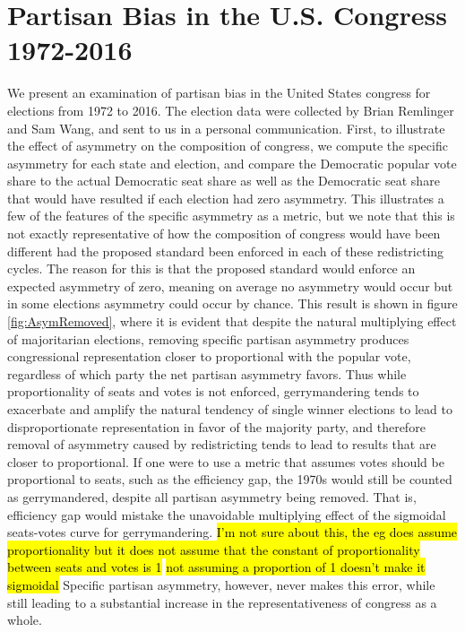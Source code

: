 \documentclass[preprint,12pt]{article}
\newcommand{\CM}[2][green]{ {\sethlcolor{#1} \hl{#2}} }
\newcommand{\KB}[2][cyan]{ {\sethlcolor{#1} \hl{#2}} }
\begin{document}
\section{Partisan Bias in the U.S. Congress 1972-2016\label{sec:Hist}}
We present an examination of partisan bias in the United States congress for elections from 1972 to 2016.
The election data were collected by Brian Remlinger and Sam Wang, and sent to us in a personal communication.
First, to illustrate the effect of asymmetry on the composition of congress, we compute the specific asymmetry for each state and election, and compare the Democratic popular vote share to the actual Democratic seat share as well as the Democratic seat share that would have resulted if each election had zero asymmetry.
This illustrates a few of the features of the specific asymmetry as a metric, but we note that this is not exactly representative of how the composition of congress would have been different had the proposed standard been enforced in each of these redistricting cycles.
The reason for this is that the proposed standard would enforce an expected asymmetry of zero, meaning on average no asymmetry would occur but in some elections asymmetry could occur by chance.
This result is shown in figure \ref{fig:AsymRemoved}, where it is evident that despite the natural multiplying effect of majoritarian elections, removing specific partisan asymmetry produces congressional representation closer to proportional with the popular vote, regardless of which party the net partisan asymmetry favors.  
Thus while proportionality of seats and votes is not enforced, gerrymandering tends to exacerbate and amplify the natural tendency of single winner elections to lead to disproportionate representation in favor of the majority party, and therefore removal of asymmetry caused by redistricting tends to lead to results that are closer to proportional.
If one were to use a metric that assumes votes should be proportional to seats, such as the efficiency gap, the 1970s would still be counted as gerrymandered, despite all partisan asymmetry being removed.  
That is, efficiency gap would mistake the unavoidable multiplying effect of the sigmoidal seats-votes curve for gerrymandering.\CM{I'm not sure about this, the eg does assume proportionality but it does not assume that the constant of proportionality between seats and votes is 1} \KB{not assuming a proportion of 1 doesn't make it sigmoidal}
Specific partisan asymmetry, however, never makes this error, while still leading to a substantial increase in the representativeness of congress as a whole.
\end{document}
